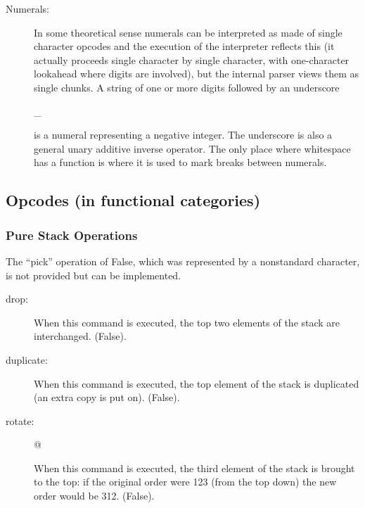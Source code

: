 \documentclass[12pt]{article}
\begin{document}
\begin{description}
\item[Numerals:] In some theoretical sense numerals can be interpreted
as made of single character opcodes and the execution of the
interpreter reflects this (it actually proceeds single character by
single character, with one-character lookahead where digits are
involved), but the internal parser views them as single chunks.  A
string of one or more digits followed by an underscore \begin{verb} _ \end{verb} is a numeral representing a negative integer.  The
underscore is also a general unary additive inverse operator.  The
only place where whitespace has a function is where it is used to mark
breaks between numerals.

\end{description}

\subsection{Opcodes (in functional categories)}

\subsubsection{Pure Stack Operations}

The ``pick'' operation of False, which was represented by a
nonstandard character, is not provided but can be implemented.

\begin{description}

\item[drop:]    When this command is executed,
the top two elements of the stack are interchanged.  (False).

\item[duplicate:] \begin{verb} $ \end{verb}  When this command is executed,
the top element of the stack is duplicated (an extra copy is put on).  (False).

\item[rotate:] \begin{verb} @ \end{verb}  When this command is executed,
the third element of the stack is brought to the top:  if the original
order were 123 (from the top down) the new order would be 312. (False).

\end{description}
\end{document}

